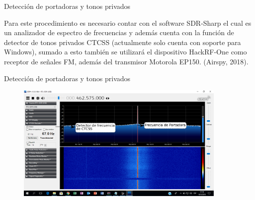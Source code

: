 \begin{frame}{Detección de portadoras y tonos privados}

Para este procedimiento es necesario contar con el software SDR-Sharp el cual es un analizador de espectro de frecuencias y además cuenta con la función de detector de tonos privados CTCSS (actualmente solo cuenta con soporte para Windows), sumado a esto también se utilizará el dispositivo HackRF-One como receptor de señales FM, además del transmisor Motorola EP150. (Airspy, 2018).

\end{frame}

\begin{frame}{Detección de portadoras y tonos privados}

\begin{figure}[H]
\centering
\vspace{-3mm}
\includegraphics[width=0.9\textwidth]{parte3/lab14/pdf/Lab14_1.pdf}
\end{figure}

\end{frame}

